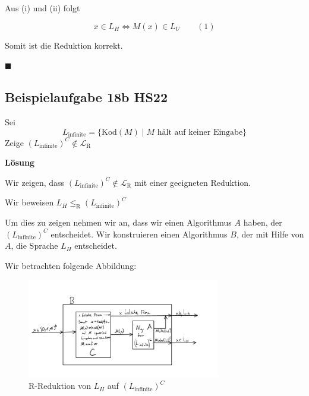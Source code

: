\documentclass[a4paper, 11pt]{article}
\def\Lr{\mathcal{L}_\text{R}}
\begin{document}
               
            
                Aus (i) und (ii) folgt 
                
                $$x \in L_H \iff M(x) \in L_U \qquad (1)$$
            
                Somit ist die Reduktion korrekt.
            
                \hspace*{0pt}\hfill$\blacksquare$
            
            
            
                \subsection{Beispielaufgabe 18b HS22}

                Sei $$L_{\text{infinite}} = \{\text{Kod}(M) \mid \text{$M$ hält auf keiner Eingabe}\}$$
                Zeige $(L_{\text{infinite}})^C \notin \Lr$
            
            
                \textbf{Lösung}

                Wir zeigen, dass $(L_{\text{infinite}})^C \notin \Lr$ mit einer geeigneten Reduktion.
            
                Wir beweisen $L_H \leq_{\text{R}} (L_{\text{infinite}})^C$
            
                Um dies zu zeigen nehmen wir an, dass wir einen Algorithmus $A$ haben, der $(L_{\text{infinite}})^C$ entscheidet.
                 Wir konstruieren einen Algorithmus $B$, der mit Hilfe von $A$, die Sprache $L_H$ entscheidet. 
                 
                Wir betrachten folgende Abbildung:
                
                \begin{figure}[htp]
                    \centering
                    \includegraphics[width=0.75\textwidth]{Images/18b_Zeichnung.png}
                    \caption{R-Reduktion von $L_H$ auf $(L_{\text{infinite}})^C$}
                \end{figure}
            
\end{document}
